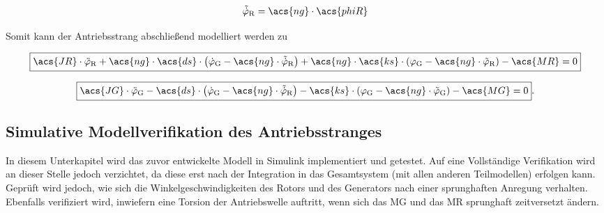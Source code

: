 \begin{align}
    \tilde{\dot\varphi}_{\mathrm{R}} = \acs{ng} \cdot \acs{phiR}
    \label{eq:Gleichung3.8}
\end{align}

Somit kann der Antriebsstrang abschließend modelliert werden zu

\begin{equation}
    \label{eq:Gleichung3.9}
   \boxed{\acs{JR} \cdot \ddot{\varphi}_{\mathrm{R}} + \acs{ng} \cdot \acs{ds} \cdot \left( \dot\varphi_{\mathrm{G}} - \acs{ng} \cdot \tilde{\dot\varphi}_{\mathrm{R}}\right) + \acs{ng} \cdot \acs{ks} \cdot \left( \varphi_{\mathrm{G}} - \acs{ng} \cdot \tilde{\varphi}_{\mathrm{R}}\right) - \acs{MR} = 0}
\end{equation}

\begin{equation}
   \label{eq:Gleichung3.10}
   \boxed{\acs{JG} \cdot \ddot{\varphi}_{\mathrm{G}} - \acs{ds} \cdot \left( \dot\varphi_{\mathrm{G}} - \acs{ng} \cdot \tilde{\dot\varphi}_{\mathrm{R}}\right) - \acs{ks} \cdot \left( \varphi_{\mathrm{G}} - \acs{ng} \cdot \tilde{\varphi}_{\mathrm{G}}\right) - \acs{MG} = 0}.
\end{equation}
\clearpage

\subsection{Simulative Modellverifikation des Antriebsstranges}

In diesem Unterkapitel wird das zuvor entwickelte Modell in Simulink implementiert und getestet. Auf eine Vollständige Verifikation wird an dieser Stelle jedoch verzichtet, da diese erst nach der Integration in das Gesamtsystem (mit allen anderen Teilmodellen) erfolgen kann. Geprüft wird jedoch, wie sich die Winkelgeschwindigkeiten des Rotors und des Generators nach einer sprunghaften Anregung verhalten. Ebenfalls verifiziert wird, inwiefern eine Torsion der Antriebswelle auftritt, wenn sich das \acl{MG} und das \acl{MR} sprunghaft zeitversetzt ändern. \\

